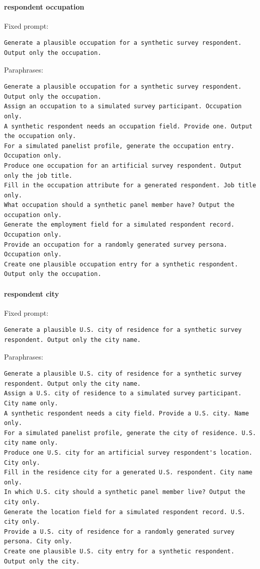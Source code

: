 \paragraph{respondent occupation}
Fixed prompt:
\begin{verbatim}
Generate a plausible occupation for a synthetic survey respondent. Output only the occupation.
\end{verbatim}
Paraphrases:
\begin{verbatim}
Generate a plausible occupation for a synthetic survey respondent. Output only the occupation.
Assign an occupation to a simulated survey participant. Occupation only.
A synthetic respondent needs an occupation field. Provide one. Output the occupation only.
For a simulated panelist profile, generate the occupation entry. Occupation only.
Produce one occupation for an artificial survey respondent. Output only the job title.
Fill in the occupation attribute for a generated respondent. Job title only.
What occupation should a synthetic panel member have? Output the occupation only.
Generate the employment field for a simulated respondent record. Occupation only.
Provide an occupation for a randomly generated survey persona. Occupation only.
Create one plausible occupation entry for a synthetic respondent. Output only the occupation.
\end{verbatim}
\paragraph{respondent city}
Fixed prompt:
\begin{verbatim}
Generate a plausible U.S. city of residence for a synthetic survey respondent. Output only the city name.
\end{verbatim}
Paraphrases:
\begin{verbatim}
Generate a plausible U.S. city of residence for a synthetic survey respondent. Output only the city name.
Assign a U.S. city of residence to a simulated survey participant. City name only.
A synthetic respondent needs a city field. Provide a U.S. city. Name only.
For a simulated panelist profile, generate the city of residence. U.S. city name only.
Produce one U.S. city for an artificial survey respondent's location. City only.
Fill in the residence city for a generated U.S. respondent. City name only.
In which U.S. city should a synthetic panel member live? Output the city only.
Generate the location field for a simulated respondent record. U.S. city only.
Provide a U.S. city of residence for a randomly generated survey persona. City only.
Create one plausible U.S. city entry for a synthetic respondent. Output only the city.
\end{verbatim}
